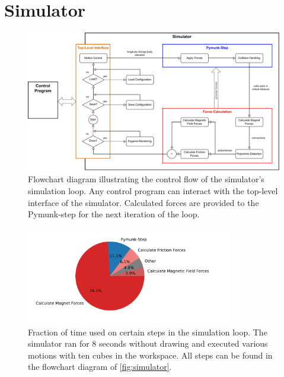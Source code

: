 \chapter{Simulator}
\label{chap:sim}

\begin{figure}
	\centering
	\includegraphics[width=1\textwidth]{figures/simulator_controlflow.pdf}
	\caption[Control flow of the simulator's simulation loop]{Flowchart diagram illustrating the control flow of the simulator's simulation loop. Any control program can interact with the top-level interface of the simulator. Calculated forces are provided to the Pymunk-step for the next iteration of the loop.}
	\label{fig:simulator}
\end{figure}

\begin{figure}
	\centering
	\includegraphics[width=0.8\textwidth]{figures/plots/simulator_timeuse.pdf}
	\caption[Time-use for certain steps in simulation loop]{Fraction of time used on certain steps in the simulation loop. The simulator ran for $8$ seconds without drawing and executed various motions with ten cubes in the workspace. All steps can be found in the flowchart diagram of \autoref{fig:simulator}.}
	\label{fig:timeuse}
\end{figure}

